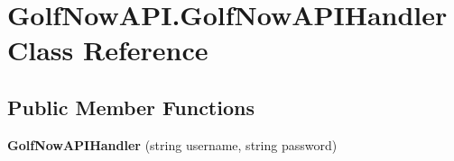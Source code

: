 \hypertarget{class_golf_now_a_p_i_1_1_golf_now_a_p_i_handler}{}\section{Golf\+Now\+A\+P\+I.\+Golf\+Now\+A\+P\+I\+Handler Class Reference}
\label{class_golf_now_a_p_i_1_1_golf_now_a_p_i_handler}
\subsection*{Public Member Functions}
\begin{DoxyCompactItemize}
\item 
\mbox{\label{class_golf_now_a_p_i_1_1_golf_now_a_p_i_handler_af61b298c9035059b7bcd9c46caee59ea}} 
{\bfseries Golf\+Now\+A\+P\+I\+Handler} (string username, string password)
\end{DoxyCompactItemize}
